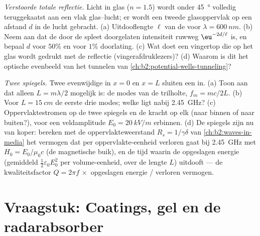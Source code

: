 \begin{exercise}[$\star\star\star$]\label{exo:b2:wave-interfaces:11}
\emph{Verstoorde totale reflectie.} Licht in glas ($n = 1.5$) wordt onder
\qty{45}{\degree} volledig teruggekaatst aan een vlak glas--lucht; er wordt
een tweede glasoppervlak op een afstand $d$ in de lucht gebracht. (a)
Uitdooflengte $\ell$ van de  voor $\lambda = \qty{600}{nm}$.
(b) Neem aan dat de door de spleet doorgelaten intensiteit ruwweg
$\eu^{-2d/\ell}$ is, en bepaal $d$ voor $50\%$ en voor $1\%$ doorlating. (c)
Wat doet een vingertop die op het glas wordt gedrukt met de reflectie
(vingerafdruklezers)? (d) Waarom is dit het optische evenbeeld van het
tunnelen van \cref{ch:b2:potential-wells-tunneling}?
\end{exercise}

\begin{exercise}[$\star\star\star$]\label{exo:b2:wave-interfaces:12}
\emph{Twee spiegels.} Twee evenwijdige  in $x = 0$ en
$x =
L$ sluiten een  in. (a) Toon aan dat alleen
$L = m\lambda/2$ mogelijk is: de modes van de trilholte, $f_m = mc/2L$. (b)
Voor $L = \qty{15}{cm}$ de eerste drie modes; welke ligt nabij
\qty{2.45}{GHz}? (c) Oppervlaktestromen op de twee spiegels en de kracht op
elk (naar binnen of naar buiten?), voor een veldamplitude
$E_0 = \qty{20}{kV/m}$ erbinnen. (d) De spiegels zijn nu van koper: bereken
met de oppervlakteweerstand $R_s = 1/\gamma\delta$ van
\cref{ch:b2:waves-in-media} het vermogen dat per oppervlakte-eenheid
verloren gaat bij \qty{2.45}{GHz} met $H_0 = E_0/\mu_0c$ (de magnetische
buik), en de tijd waarin de opgeslagen energie (gemiddeld
$\tfrac12\varepsilon_0E_0^2$ per volume-eenheid, over de lengte $L$)
uitdooft --- de kwaliteitsfactor $Q = 2\pi f\,\times$ opgeslagen energie /
verloren vermogen.
\end{exercise}

\section{Vraagstuk: Coatings, gel en de radarabsorber}

